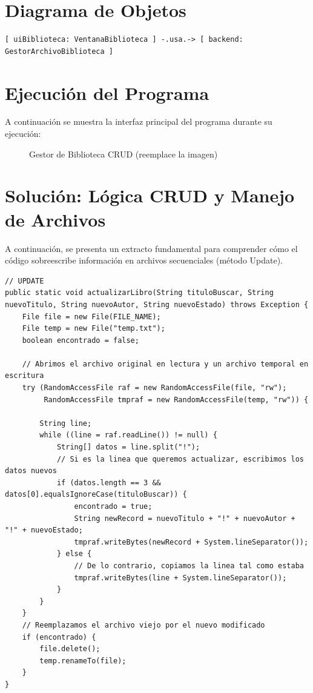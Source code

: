 \documentclass[12pt,a4paper]{article}
\begin{document}
\section{Diagrama de Objetos}
\begin{verbatim}
[ uiBiblioteca: VentanaBiblioteca ] -.usa.-> [ backend: GestorArchivoBiblioteca ]
\end{verbatim}

\section{Ejecución del Programa}
A continuación se muestra la interfaz principal del programa durante su ejecución:

\begin{figure}[h]
    \centering
    \vspace{4cm} 
    \caption{Gestor de Biblioteca CRUD (reemplace la imagen)}
\end{figure}

\section{Solución: Lógica CRUD y Manejo de Archivos}
A continuación, se presenta un extracto fundamental para comprender cómo el código sobreescribe información en archivos secuenciales (método Update).

\begin{lstlisting}[caption={Clase GestorArchivoBiblioteca.java (Extracto)}]
// UPDATE
public static void actualizarLibro(String tituloBuscar, String nuevoTitulo, String nuevoAutor, String nuevoEstado) throws Exception {
    File file = new File(FILE_NAME);
    File temp = new File("temp.txt");
    boolean encontrado = false;

    // Abrimos el archivo original en lectura y un archivo temporal en escritura
    try (RandomAccessFile raf = new RandomAccessFile(file, "rw");
         RandomAccessFile tmpraf = new RandomAccessFile(temp, "rw")) {

        String line;
        while ((line = raf.readLine()) != null) {
            String[] datos = line.split("!");
            // Si es la linea que queremos actualizar, escribimos los datos nuevos
            if (datos.length == 3 && datos[0].equalsIgnoreCase(tituloBuscar)) {
                encontrado = true;
                String newRecord = nuevoTitulo + "!" + nuevoAutor + "!" + nuevoEstado;
                tmpraf.writeBytes(newRecord + System.lineSeparator());
            } else {
                // De lo contrario, copiamos la linea tal como estaba
                tmpraf.writeBytes(line + System.lineSeparator());
            }
        }
    }
    // Reemplazamos el archivo viejo por el nuevo modificado
    if (encontrado) {
        file.delete();
        temp.renameTo(file);
    }
}
\end{lstlisting}
\end{document}
